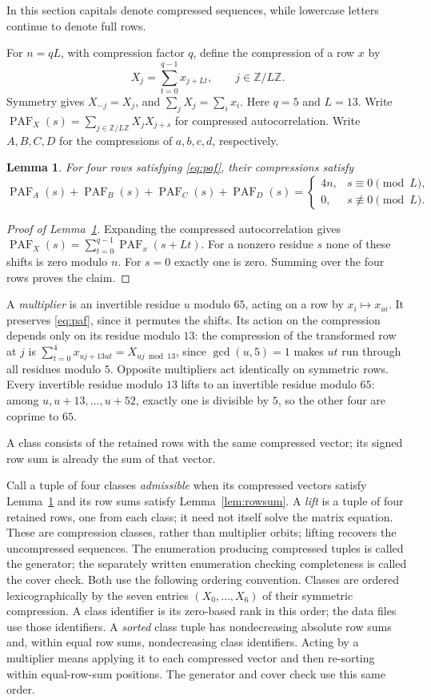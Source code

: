 \documentclass[11pt]{article}
\newtheorem{lemma}[theorem]{Lemma}
\newcommand{\PAF}{\operatorname{PAF}}
\newcommand{\Z}{\mathbb Z}
\begin{document}
In this section capitals denote compressed sequences, while lowercase
letters continue to denote full rows.

For $n=qL$, with compression factor $q$, define the compression of a row $x$ by
\[
 X_j=\sum_{t=0}^{q-1}x_{j+Lt},\qquad j\in\Z/L\Z.
\]
Symmetry gives $X_{-j}=X_j$, and $\sum_jX_j=\sum_ix_i$.
Here $q=5$ and $L=13$. Write
$\PAF_X(s)=\sum_{j\in\Z/L\Z}X_jX_{j+s}$ for compressed autocorrelation.
Write $A,B,C,D$ for the compressions of $a,b,c,d$, respectively.
\begin{lemma}\label{lem:compression}
For four rows satisfying \eqref{eq:paf}, their compressions satisfy
\[
 \PAF_A(s)+\PAF_B(s)+\PAF_C(s)+\PAF_D(s)
 =\begin{cases}4n,&s\equiv0\pmod L,\\0,&s\not\equiv0\pmod L.\end{cases}
\]
\end{lemma}

\begin{proof}[Proof of Lemma~\ref{lem:compression}]
Expanding the compressed autocorrelation gives
$\PAF_X(s)=\sum_{t=0}^{q-1}\PAF_x(s+Lt)$.
For a nonzero residue $s$ none of these shifts is zero modulo $n$.
For $s=0$ exactly one is zero. Summing over the four rows proves the claim.
\end{proof}

A \emph{multiplier} is an invertible residue $u$ modulo $65$, acting on
a row by $x_i\mapsto x_{ui}$. It preserves \eqref{eq:paf}, since it
permutes the shifts. Its action on the compression depends only on its
residue modulo $13$: the compression of the transformed row at $j$ is
$\sum_{t=0}^4x_{uj+13ut}=X_{uj\bmod13}$, since $\gcd(u,5)=1$ makes
$ut$ run through all residues modulo $5$. Opposite multipliers act identically on symmetric
rows. Every invertible residue modulo $13$ lifts to an invertible residue
modulo $65$: among $u,u+13,\ldots,u+52$, exactly one is divisible by $5$,
so the other four are coprime to $65$.

A class consists of the retained rows with the
same compressed vector; its signed row sum is already the sum of that vector.

Call a tuple of four classes \emph{admissible} when its compressed
vectors satisfy Lemma~\ref{lem:compression} and its row sums satisfy
Lemma~\ref{lem:rowsum}. A \emph{lift} is a tuple of four retained rows,
one from each class; it need not itself solve the matrix equation.
These are compression classes, rather than multiplier orbits; lifting
recovers the uncompressed sequences.
The enumeration producing compressed tuples is called the generator;
the separately written enumeration checking completeness is called the cover check.
Both use the following ordering convention.
Classes are ordered lexicographically by the seven entries
$(X_0,\ldots,X_6)$ of their symmetric compression. A class identifier is
its zero-based rank in this order; the data files use those identifiers. A \emph{sorted} class tuple
has nondecreasing absolute row sums and, within equal row sums,
nondecreasing class identifiers. Acting by a multiplier means applying it
to each compressed vector and then re-sorting within equal-row-sum
positions. The generator and cover check use this same order.
\end{document}
